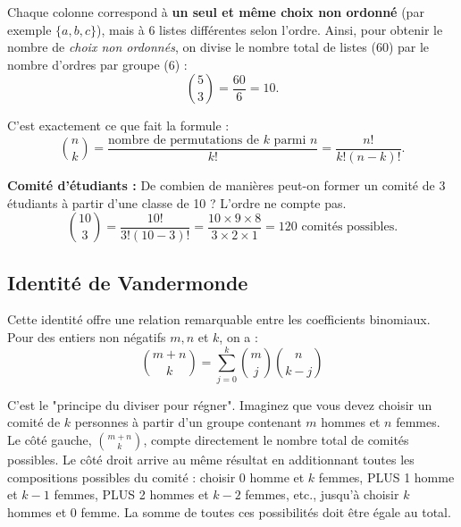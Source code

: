 \begin{intuitionbox}
\smallskip

Chaque colonne correspond à \textbf{un seul et même choix non ordonné} (par exemple $\{a,b,c\}$), mais à 6 listes différentes selon l’ordre.  
Ainsi, pour obtenir le nombre de \textit{choix non ordonnés}, on divise le nombre total de listes ($60$) par le nombre d’ordres par groupe ($6$) :
\[
\binom{5}{3} = \frac{60}{6} = 10.
\]

\medskip

\noindent C’est exactement ce que fait la formule :
\[
\binom{n}{k} = \frac{\text{nombre de permutations de } k \text{ parmi } n}{k!} = \frac{n!}{k!(n-k)!}.
\]

\end{intuitionbox}

\begin{examplebox}
    \textbf{Comité d'étudiants :} De combien de manières peut-on former un comité de 3 étudiants à partir d'une classe de 10 ? L'ordre ne compte pas.
    $$ \binom{10}{3} = \frac{10!}{3!(10-3)!} = \frac{10 \times 9 \times 8}{3 \times 2 \times 1} = 120 \text{ comités possibles.} $$
\end{examplebox}

\subsection{Identité de Vandermonde}

\begin{theorembox}
Cette identité offre une relation remarquable entre les coefficients binomiaux. Pour des entiers non négatifs $m, n$ et $k$, on a :
$$ \binom{m+n}{k} = \sum_{j=0}^{k} \binom{m}{j} \binom{n}{k-j} $$
\end{theorembox}

\begin{intuitionbox}
C'est le "principe du diviser pour régner". Imaginez que vous devez choisir un comité de $k$ personnes à partir d'un groupe contenant $m$ hommes et $n$ femmes.
Le côté gauche, $\binom{m+n}{k}$, compte directement le nombre total de comités possibles.
Le côté droit arrive au même résultat en additionnant toutes les compositions possibles du comité : choisir 0 homme et $k$ femmes, PLUS 1 homme et $k-1$ femmes, PLUS 2 hommes et $k-2$ femmes, etc., jusqu'à choisir $k$ hommes et 0 femme. La somme de toutes ces possibilités doit être égale au total.
\end{intuitionbox}

